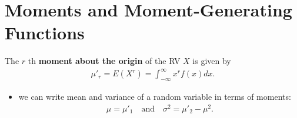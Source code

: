 \documentclass[10pt]{article}
\begin{document}
\section{Moments and Moment-Generating Functions}
\begin{definition}
    The $r$ th \textbf{moment about the origin} of the RV $X$ is given by 
    \begin{gather*}
        \mu'_r = E(X^r) = \int_{-\infty}^{\infty} x^r f(x) dx 
    .\end{gather*}
\end{definition}
\begin{itemize}
    \item we can write mean and variance of a random variable in terms of moments: 
        \begin{gather*}
            \mu = \mu'_1 \quad \text{and} \quad \sigma^2 = \mu'_2 - \mu^2
        .\end{gather*}
\end{itemize}
\end{document}
